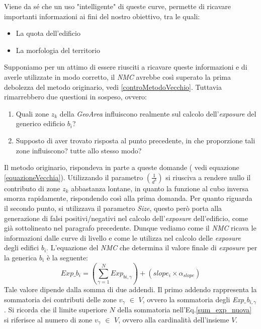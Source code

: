 Viene da sé che un uso "intelligente" di queste curve, permette di ricavare importanti informazioni ai fini del nostro obiettivo, tra le quali:
\begin{itemize}
\item La quota dell'edificio
\item La morfologia del territorio
\end{itemize}
Supponiamo per un attimo di essere riusciti a ricavare queste informazioni e di averle utilizzate in modo corretto, il \textit{NMC} avrebbe così superato la prima debolezza del metodo originario, vedi \ref{controMetodoVecchio}.
Tuttavia rimarrebbero due questioni in sospeso, ovvero:
\begin{enumerate}
\label{domande}
\item Quali zone $z_k$ della \textit{GeoArea} influiscono realmente sul calcolo dell'\textit{exposure} del generico edificio $b_i$?
\item Supposto di aver trovato risposta al punto precedente, in che proporzione tali zone influiscono? tutte allo stesso modo?
\end{enumerate}
Il metodo originario, rispondeva in parte a queste domande ( vedi equazione \ref{equazioneVecchia}). \newline 
Utilizzando il parametro  $( \frac{1}{d^3} )$  si riusciva a rendere nullo il contributo di zone $z_k$ abbastanza lontane, in quanto la funzione al cubo inversa smorza rapidamente, rispondendo così alla prima domanda.\newline 
Per quanto riguarda il secondo punto, si utilizzava il parametro \textit{Size}, questo però porta alla generazione di falsi positivi/negativi nel calcolo dell'\textit{exposure} dell'edificio, come già sottolineato nel paragrafo precedente.\newline
Dunque vediamo come il \textit{NMC} ricava le informazioni dalle curve di livello e come le utilizza nel calcolo delle \textit{exposure} degli edifici $b_i$. 
\newline
L'equazione del \textit{NMC} che determina il valore finale di \textit{exposure} per la generica $b_i$ è la seguente:
\begin{equation}
\label{sum_exp_nuova}
 Exp\_b_i = (\sum\limits_{\gamma=1}^N  Exp_{bi,\gamma}) + (slope_i \times \alpha_{slope})
\end{equation}
Tale valore dipende dalla somma di due addendi. \newline
Il primo addendo rappresenta la sommatoria dei contributi delle zone $v_\gamma$ $\in$ $V$, ovvero la sommatoria degli \textit{Exp$\_$b$_{i,\gamma}$}. Si ricorda che il limite superiore $N$ della sommatoria nell'Eq.\ref{sum_exp_nuova} si riferisce al numero di zone $v_\gamma$ $\in$ $V$, ovvero alla cardinalità dell'insieme \textit{$V$}. \newline \newline
